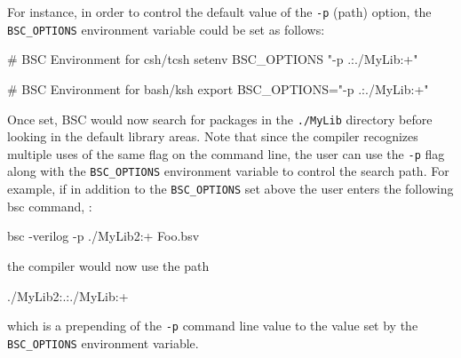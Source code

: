 \documentclass{article}
\newcommand{\te}[1]{\texttt{#1}}
\newenvironment{centerboxverbatim}
  {\center
   \boxedverbatim}
  {\endboxedverbatim
  {\endcenter }}
\begin{document}

For instance, in order to control the default value of the \te{-p} (path)
option, the \te{BSC\_OPTIONS} environment variable could be set as follows:

\begin{centerboxverbatim}
# BSC Environment for csh/tcsh
setenv BSC_OPTIONS "-p .:./MyLib:+"

# BSC Environment for bash/ksh
export BSC_OPTIONS="-p .:./MyLib:+"
\end{centerboxverbatim}


Once set, BSC would now search for packages in the
\te{./MyLib} directory before looking in the default library
areas. Note that since the compiler  recognizes multiple uses of
the same flag on the command line, the user can use the \te{-p}
flag along with  the \te{BSC\_OPTIONS} environment variable to control
the search path. For example, if in addition to the \te{BSC\_OPTIONS}
set above the user enters the following bsc
command, :

\begin{centerboxverbatim}
    bsc -verilog -p ./MyLib2:+ Foo.bsv
\end{centerboxverbatim}

the compiler would now use the path

\begin{centerboxverbatim}
    ./MyLib2:.:./MyLib:+
\end{centerboxverbatim}

which is a prepending of the \te{-p} command line value to the value set by the
\te{BSC\_OPTIONS} environment variable.


\end{document}
